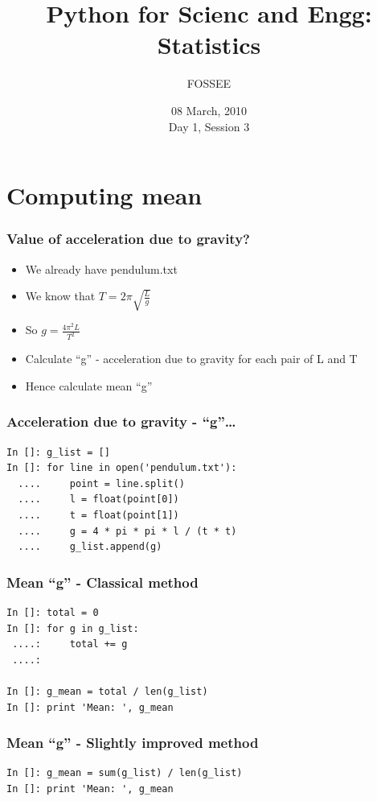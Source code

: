 \documentclass[14pt,compress]{beamer}
\title[Statistics]{Python for Scienc and Engg: Statistics}
\author[FOSSEE] {FOSSEE}
\institute[IIT Bombay] {Department of Aerospace Engineering\\IIT Bombay}
\date[] {08 March, 2010\\Day 1, Session 3}
\begin{document}
\begin{frame}
  \maketitle
\end{frame}


\section{Computing mean}
\begin{frame}
  \frametitle{Value of acceleration due to gravity?}
  \begin{itemize}
    \item We already have pendulum.txt
    \item We know that $ T = 2\pi \sqrt{\frac{L}{g}} $
    \item So $ g = \frac{4 \pi^2 L}{T^2}  $
    \item Calculate ``g'' - acceleration due to gravity for each pair of L and T
    \item Hence calculate mean ``g''
  \end{itemize}
\end{frame}

\begin{frame}[fragile]
  \frametitle{Acceleration due to gravity - ``g''\ldots}
  \begin{lstlisting}
In []: g_list = []
In []: for line in open('pendulum.txt'):
  ....     point = line.split()
  ....     l = float(point[0])
  ....     t = float(point[1])
  ....     g = 4 * pi * pi * l / (t * t)
  ....     g_list.append(g)
  \end{lstlisting}
\end{frame}

\begin{frame}[fragile]
  \frametitle{Mean ``g'' - Classical method}
  \begin{lstlisting}
In []: total = 0
In []: for g in g_list:
 ....:     total += g
 ....:

In []: g_mean = total / len(g_list)
In []: print 'Mean: ', g_mean
  \end{lstlisting}
\end{frame}

\begin{frame}[fragile]
  \frametitle{Mean ``g'' - Slightly improved method}
  \begin{lstlisting}
In []: g_mean = sum(g_list) / len(g_list)
In []: print 'Mean: ', g_mean
  \end{lstlisting}
\end{frame}
\end{document}
